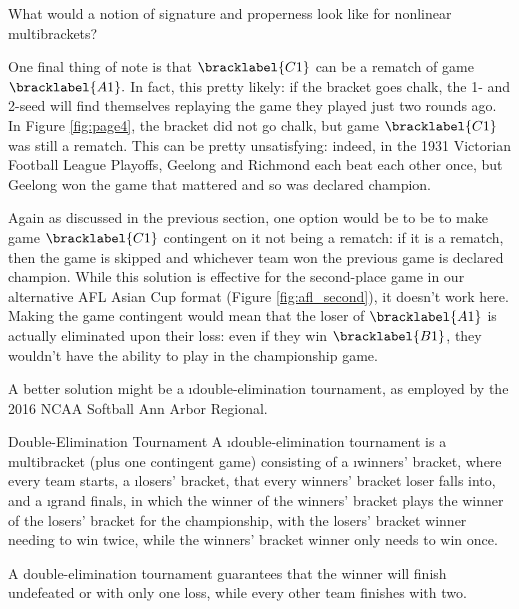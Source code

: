 {    \begin{oq}{}{}
        What would a notion of signature and properness look like for nonlinear multibrackets?
    \end{oq}


    One final thing of note is that $\bracklabel{C1}$ can be a rematch of game $\bracklabel{A1}.$ In fact, this pretty likely: if the bracket goes chalk, the 1- and 2-seed will find themselves replaying the game they played just two rounds ago. In Figure \ref{fig:page4}, the bracket did not go chalk, but game $\bracklabel{C1}$ was still a rematch. 
    This can be pretty unsatisfying: indeed, in the 1931 Victorian Football League Playoffs, Geelong and Richmond each beat each other once, but Geelong won the game that mattered and so was declared champion. 
    
    Again as discussed in the previous section, one option would be to be to make game $\bracklabel{C1}$ contingent on it not being a rematch: if it is a rematch, then the game is skipped and whichever team won the previous game is declared champion. While this solution is effective for the second-place game in our alternative AFL Asian Cup format (Figure \ref{fig:afl_second}), it doesn't work here. Making the game contingent would mean that the loser of $\bracklabel{A1}$ is actually eliminated upon their loss: even if they win $\bracklabel{B1}$, they wouldn't have the ability to play in the championship game.

    A better solution might be a \i{double-elimination tournament}, as employed by the 2016 NCAA Softball Ann Arbor Regional.


    \begin{definition}{Double-Elimination Tournament}{}
        A \i{double-elimination} tournament is a multibracket (plus one contingent game) consisting of a \i{winners' bracket}, where every team starts, a \i{losers'} bracket, that every winners' bracket loser falls into, and a \i{grand finals}, in which the winner of the winners' bracket plays the winner of the losers' bracket for the championship, with the losers' bracket winner needing to win twice, while the winners' bracket winner only needs to win once. 
    \end{definition}

    A double-elimination tournament guarantees that the winner will finish undefeated or with only one loss, while every other team finishes with two.

}
